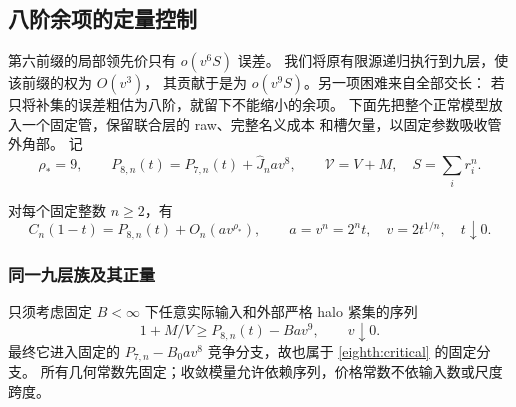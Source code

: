 \subsection{八阶余项的定量控制}
\label{quant:section}

第六前缀的局部领先价只有 \(o(v^6S)\) 误差。
我们将原有限源递归执行到九层，使该前缀的权为 \(O(v^3)\)，
其贡献于是为 \(o(v^9S)\)。另一项困难来自全部交长：
若只将补集的误差粗估为八阶，就留下不能缩小的余项。
下面先把整个正常模型放入一个固定管，保留联合层的 raw、完整名义成本
和槽欠量，以固定参数吸收管外角部。
记
\[
 \rho_*=9,\qquad
 P_{8,n}(t)=P_{7,n}(t)+\widehat J_nav^8,\qquad
 \mathcal V=V+M,\quad S=\sum_i r_i^n.
\]

\begin{theorem}[八阶展开的九阶余项]\label{quant:power}
对每个固定整数 \(n\ge2\)，有
\[
 C_n(1-t)=P_{8,n}(t)+O_n(av^{\rho_*}),
 \qquad a=v^n=2^nt,\quad v=2t^{1/n},\quad t\downarrow0.
\]
\end{theorem}

\subsubsection{同一九层族及其正量}

只须考虑固定 \(B<\infty\) 下任意实际输入和外部严格 halo 紧集的序列
\begin{equation}\label{quant:competitive}
 1+M/V\ge P_{8,n}(t)-Bav^9,\qquad v\downarrow0.
\end{equation}
最终它进入固定的 \(P_{7,n}-B_0av^8\) 竞争分支，故也属于
\eqref{eighth:critical} 的固定分支。
所有几何常数先固定；收敛模量允许依赖序列，价格常数不依输入数或尺度跨度。


